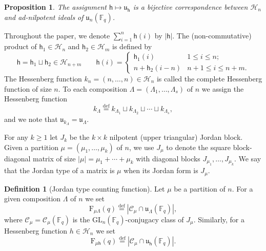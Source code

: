 \documentclass[12pt,a4paper,reqno]{amsart}
\theoremstyle{plain}
\newtheorem{proposition}[theorem]{Proposition}
\theoremstyle{definition}
\newtheorem{definition}[theorem]{Definition}
\newcommand{\defin}{\overset{\mathrm{def}}{=}}
\newcommand{\FF}{{\mathbb{F}}}
\newcommand{\1}{\mathds{1}}
\newcommand{\C}{\mathcal{C}}
\newcommand{\GL}{\mathrm{GL}}
\newcommand{\F}{\mathrm{F}}
\renewcommand{\u}{\mathfrak{u}}
\newcommand{\hes}{\mathsf{h}}
\begin{document}
  
\begin{proposition}  
  The assignment $\hes\mapsto\u_\hes$ is a bijective correspondence between $\mathcal{H}_n$ and ad-nilpotent ideals of $\u_n(\FF_q)$. 
\end{proposition}  
Throughout the paper, we denote $\sum_{i=1}^n\hes(i)$ by $|\hes|$. 
The (non-commutative) product of $\hes_1 \in \mathcal{H}_n$ and $\hes_2 \in \mathcal{H}_m$ is defined by
$$
\hes=\hes_1\sqcup \hes_2\in\mathcal{H}_{n+m}\qquad 
\hes(i)=\begin{cases}
\hes_1(i) & 1\leq i\leq n;\\
n+\hes_2(i-n) & n+1\leq i\leq n+m.
\end{cases}
$$
The Hessenberg function $k_n = (n, \dots, n) \in \mathcal{H}_n$ is called the complete Hessenberg function of size $n$. To each composition $\Lambda=(\Lambda_1,\dots,\Lambda_s)$ of $n$ we assign the Hessenberg function 
\begin{equation}\label{k_partiton}
k_\Lambda\defin k_{\Lambda_1} \sqcup k_{\Lambda_2} \sqcup \cdots \sqcup k_{\Lambda_s},
\end{equation}
and we note that $\u_{k_\Lambda}=\u_\Lambda$.









For any $k\geq 1$ let $J_k$ be the  $k\times k$ nilpotent (upper triangular) Jordan block.
Given a partition  $\mu=(\mu_1,\dots,\mu_k)$ of $n$, we use $J_\mu$ to denote the square block-diagonal matrix of size $|\mu|=\mu_1+\cdots+\mu_k$  with diagonal blocks $J_{\mu_1},\ldots,J_{\mu_k}$.  We say that the Jordan type of a matrix is $\mu$ when its Jordan form is $J_\mu$. 



 \begin{definition}[Jordan type counting function]
Let $\mu$ be a partition of $n$.  
For a given composition $\Lambda$ of $n$ we set
\begin{equation}\label{Flambda}
\F_{\mu\Lambda}(q)\defin
| \C_\mu\cap \mathfrak u_\Lambda(\FF_q)|,
\end{equation}
where $\C_\mu=\C_\mu(\FF_q)$ is the $\GL_n(\FF_q)$-conjugacy class of $J_\mu$.
Similarly, for a Hessenberg function $h\in\mathcal{H}_n$ we set 
\begin{equation}\label{Hess_jordan}
    \F_{\mu\hes}(q)\defin |\mathcal{C}_\mu\cap \u_\hes(\FF_q)|.
\end{equation}


 \end{definition} 
\end{document}
